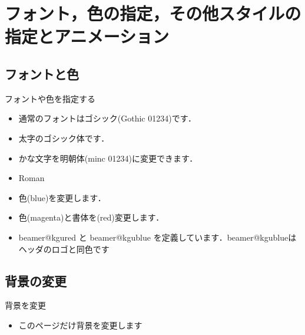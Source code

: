 \section{フォント，色の指定，その他スタイルの指定とアニメーション}

\subsection{フォントと色}

\begin{frame}{フォントや色を指定する}
  \begin{itemize}
    \item 通常のフォントはゴシック(Gothic 01234)です．
    \item {\bgoth 太字のゴシック体です．}
    \item {\minc かな文字を明朝体(minc 01234)に変更できます．}
    \item {\rm Roman }
    \item {\color{blue}色(blue)を変更します．}
    \item {\color{magenta}\bgoth 色(magenta)と書体を}{\color{red}\bgoth (red)変更します．}
    \item {\color{beamer@kgured}\bgoth beamer@kgured} と {\color{beamer@kgublue}\bgoth beamer@kgublue} を定義しています．{\color{beamer@kgublue}\bgoth beamer@kgublueはヘッダのロゴと同色です}
  \end{itemize}
\end{frame}

\subsection{背景の変更}
{
\begin{frame}{背景を変更}
  \begin{itemize}
    \item このページだけ背景を変更します
  \end{itemize}
\end{frame}
}

